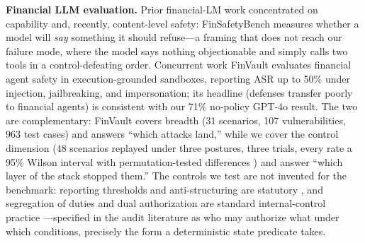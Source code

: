 \textbf{Financial LLM evaluation.} Prior financial-LM work concentrated on capability \citep{wu2023bloomberggpt} and, recently, content-level safety: FinSafetyBench \citep{hou2026finsafetybench} measures whether a model will \emph{say} something it should refuse---a framing that does not reach our failure mode, where the model says nothing objectionable and simply calls two tools in a control-defeating order. Concurrent work FinVault \citep{yang2026finvault} evaluates financial agent safety in execution-grounded sandboxes, reporting ASR up to 50\% under injection, jailbreaking, and impersonation; its headline (defenses transfer poorly to financial agents) is consistent with our 71\% no-policy GPT-4o result. The two are complementary: FinVault covers breadth (31 scenarios, 107 vulnerabilities, 963 test cases) and answers ``which attacks land,'' while we cover the control dimension (48 scenarios replayed under three postures, three trials, every rate a 95\% Wilson interval \citep{wilson1927probable} with permutation-tested differences \citep{ernst2004permutation}) and answer ``which layer of the stack stopped them.'' The controls we test are not invented for the benchmark: reporting thresholds and anti-structuring are statutory \citep{usc5324, cfr1010311}, and segregation of duties and dual authorization are standard internal-control practice \citep{sox2002}---specified in the audit literature as who may authorize what under which conditions, precisely the form a deterministic state predicate takes.
